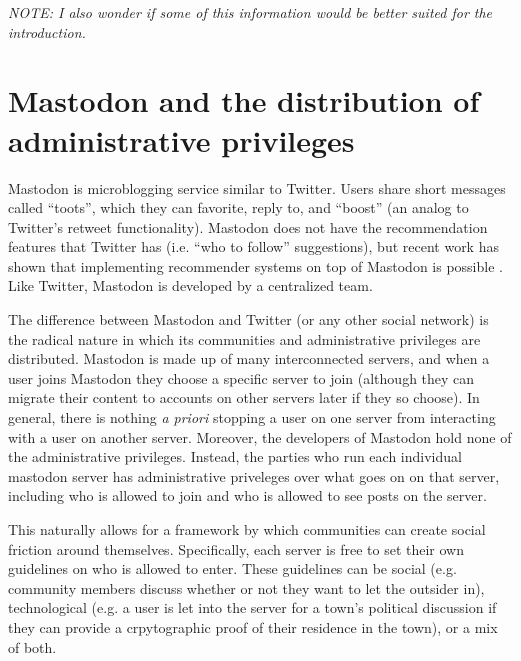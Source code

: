 \documentclass[sigconf,authordraft]{acmart}
\begin{document}
\textit{NOTE: I also wonder if some of this information would be better suited for the introduction.}

\section{Mastodon and the distribution of administrative privileges}

Mastodon is microblogging service similar to Twitter. Users share short messages called ``toots'', which they can favorite, reply to, and ``boost'' (an analog to Twitter's retweet functionality). Mastodon does not have the recommendation features that Twitter has (i.e. ``who to follow'' suggestions), but recent work has shown that implementing recommender systems on top of Mastodon is possible \cite{trienes2018recommending}. Like Twitter, Mastodon is developed by a centralized team.

The difference between Mastodon and Twitter (or any other social network) is the radical nature in which its communities and administrative privileges are distributed. Mastodon is made up of many interconnected servers, and when a user joins Mastodon they choose a specific server to join (although they can migrate their content to accounts on other servers later if they so choose). In general, there is nothing {\itshape a priori} stopping a user on one server from interacting with a user on another server. Moreover, the developers of Mastodon hold none of the administrative privileges. Instead, the parties who run each individual mastodon server has administrative priveleges over what goes on on that server, including who is allowed to join and who is allowed to see posts on the server. 

This naturally allows for a framework by which communities can create social friction around themselves. Specifically, each server is free to set their own guidelines on who is allowed to enter. These guidelines can be social (e.g. community members discuss whether or not they want to let the outsider in), technological (e.g. a user is let into the server for a town's political discussion if they can provide a crpytographic proof of their residence in the town), or a mix of both. 
\end{document}
